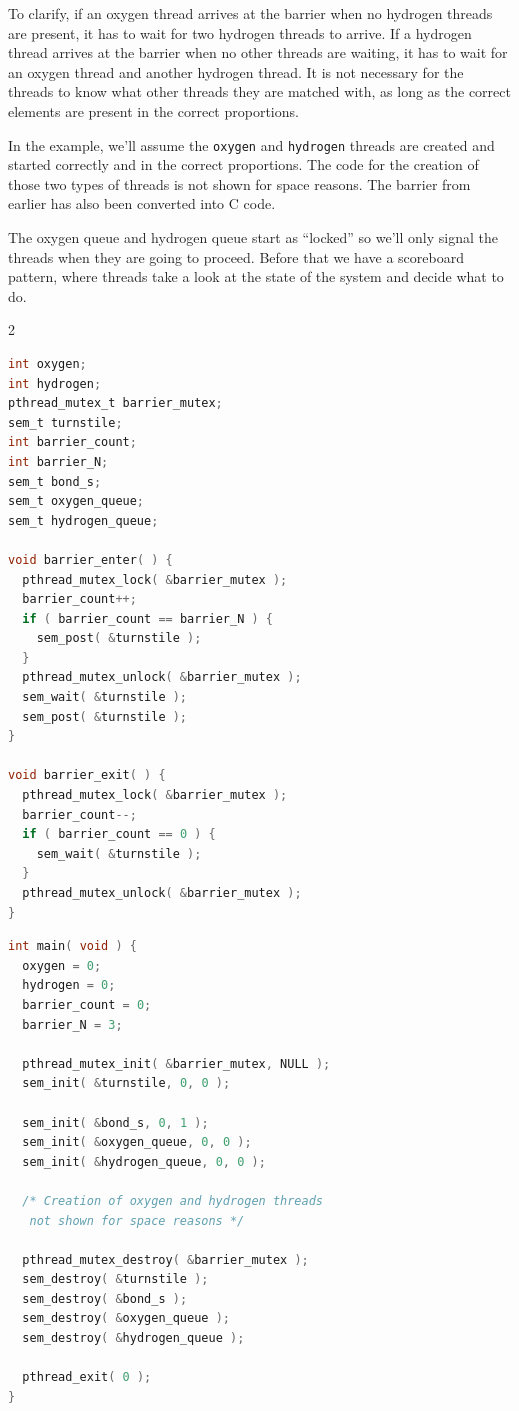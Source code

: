 To clarify, if an oxygen thread arrives at the barrier when no hydrogen threads are present, it has to wait for two hydrogen threads to arrive. If a hydrogen thread arrives at the barrier when no other threads are waiting, it has to wait for an oxygen thread and another hydrogen thread. It is not necessary for the threads to know what other threads they are matched with, as long as the correct elements are present in the correct proportions.

In the example, we'll assume the \texttt{oxygen} and \texttt{hydrogen} threads are created and started correctly and in the correct proportions. The code for the creation of those two types of threads is not shown for space reasons. The barrier from earlier has also been converted into C code.

The oxygen queue and hydrogen queue start as ``locked'' so we'll only signal the threads when they are going to proceed. Before that we have a scoreboard pattern, where threads take a look at the state of the system and decide what to do.

\begin{multicols}{2}
	\begin{lstlisting}[firstline=0, language=C]
int oxygen;
int hydrogen;
pthread_mutex_t barrier_mutex;
sem_t turnstile;
int barrier_count;
int barrier_N;
sem_t bond_s;
sem_t oxygen_queue;
sem_t hydrogen_queue;

void barrier_enter( ) {
  pthread_mutex_lock( &barrier_mutex );
  barrier_count++;
  if ( barrier_count == barrier_N ) {
    sem_post( &turnstile );
  }
  pthread_mutex_unlock( &barrier_mutex );
  sem_wait( &turnstile );
  sem_post( &turnstile );            
}

void barrier_exit( ) {
  pthread_mutex_lock( &barrier_mutex );
  barrier_count--;
  if ( barrier_count == 0 ) {
    sem_wait( &turnstile );
  }
  pthread_mutex_unlock( &barrier_mutex );
}


\end{lstlisting}
	\columnbreak
	\begin{lstlisting}[language=C]
int main( void ) {
  oxygen = 0;
  hydrogen = 0;
  barrier_count = 0;
  barrier_N = 3;

  pthread_mutex_init( &barrier_mutex, NULL );
  sem_init( &turnstile, 0, 0 );
  
  sem_init( &bond_s, 0, 1 );
  sem_init( &oxygen_queue, 0, 0 );
  sem_init( &hydrogen_queue, 0, 0 ); 

  /* Creation of oxygen and hydrogen threads
   not shown for space reasons */

  pthread_mutex_destroy( &barrier_mutex );
  sem_destroy( &turnstile );
  sem_destroy( &bond_s );
  sem_destroy( &oxygen_queue );
  sem_destroy( &hydrogen_queue );   

  pthread_exit( 0 );
}

\end{lstlisting}
\end{multicols}

